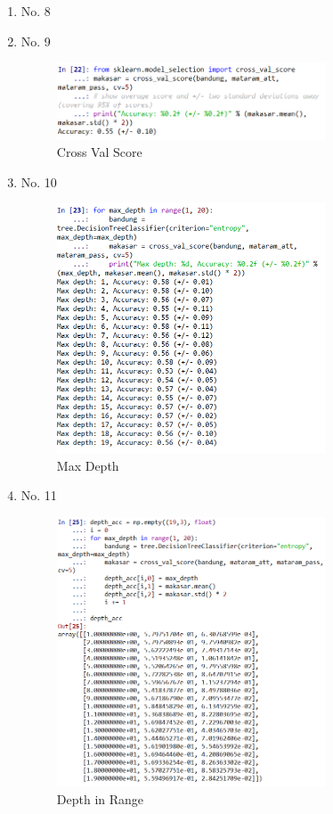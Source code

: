 \begin{enumerate}
\item No. 8
	

\item No. 9
	\hfill\\
	
\begin{figure}[H]
    \includegraphics[width=8cm]{figures/1174084/2/praktek/9.png}
    \centering
    \caption{Cross Val Score}
\end{figure}

\item No. 10
	\hfill\\
	
\begin{figure}[H]
    \includegraphics[width=8cm]{figures/1174084/2/praktek/10.png}
    \centering
    \caption{Max Depth}
\end{figure}

\item No. 11
	\hfill\\
	
\begin{figure}[H]
    \includegraphics[width=8cm]{figures/1174084/2/praktek/11.png}
    \centering
    \caption{Depth in Range}
\end{figure}


\end{enumerate}
